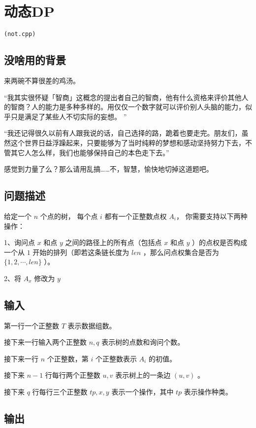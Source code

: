 \documentclass[UTF8]{ctexart}
\begin{document}
\newpage
\section{动态DP}
\begin{center}
\tt\large{(not.cpp)}
\end{center}

\subsection{没啥用的背景}

来两碗不算很差的鸡汤。

“我其实很怀疑「智商」这概念的提出者自己的智商，他有什么资格来评价其他人的智商？人的能力是多种多样的。用仅仅一个数字就可以评价别人头脑的能力，似乎只是满足了某些人不切实际的妄想。
”

“我还记得很久以前有人跟我说的话，自己选择的路，跪着也要走完。朋友们，虽然这个世界日益浮躁起来，只要能够为了当时纯粹的梦想和感动坚持努力下去，不管其它人怎么样，我们也能够保持自己的本色走下去。”

感觉到力量了么？那么请用乱搞……不，智慧，愉快地切掉这道题吧。

\subsection{问题描述}

给定一个 $n$ 个点的树， 每个点 $i$ 都有一个正整数点权 $A_i$， 你需要支持以下两种操作：

1、询问点 $x$ 和点 $y$ 之间的路径上的所有点（包括点 $x$ 和点 $y$ ）的点权是否构成一个从 $1$ 开始的排列（即若这条链长度为 $len$ ，那么问点权集合是否为 $\lbrace 1,2,\cdots,len\rbrace$ ）。

2、将 $A_x$ 修改为 $y$

\subsection{输入}

第一行一个正整数 $T$ 表示数据组数。

接下来一行输入两个正整数 $n,q$ 表示树的点数和询问个数。

接下来一行 $n$ 个正整数，第 $i$ 个正整数表示 $A_i$ 的初值。

接下来 $n−1$ 行每行两个正整数 $u,v$ 表示树上的一条边 $(u,v)$ 。

接下来 $q$ 行每行三个正整数 $tp,x,y$ 表示一个操作，其中 $tp$ 表示操作种类。

\subsection{输出}
\end{document}
